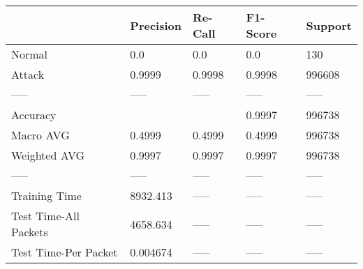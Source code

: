 \begin{tabular}{lllll}
\toprule
{} & Precision & Re-Call & F1-Score & Support \\
\midrule
Normal                &       0.0 &     0.0 &      0.0 &     130 \\
Attack                &    0.9999 &  0.9998 &   0.9998 &  996608 \\
-----                 &     ----- &   ----- &    ----- &   ----- \\
Accuracy              &           &         &   0.9997 &  996738 \\
Macro AVG             &    0.4999 &  0.4999 &   0.4999 &  996738 \\
Weighted AVG          &    0.9997 &  0.9997 &   0.9997 &  996738 \\
-----                 &     ----- &   ----- &    ----- &   ----- \\
Training Time         &  8932.413 &   ----- &    ----- &   ----- \\
Test Time-All Packets &  4658.634 &   ----- &    ----- &   ----- \\
Test Time-Per Packet  &  0.004674 &   ----- &    ----- &   ----- \\
\bottomrule
\end{tabular}
